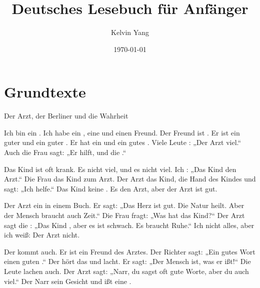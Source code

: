 \documentclass[12pt]{nextbook}
\title{Deutsches Lesebuch für Anfänger}
\author{Kelvin Yang}
\date{\today}
\begin{document}
\frontmatter
\maketitle
\tableofcontents
\mainmatter
\chapter{Grundtexte}
\begin{readersection}{Der Arzt, der Berliner und die Wahrheit}

Ich bin ein . Ich habe ein , eine  und einen  Freund. Der Freund ist . Er ist ein guter  und ein guter . Er hat ein   und ein gutes . Viele Leute : „Der Arzt  viel.“ Auch die Frau sagt: „Er hilft, und die  .“

Das Kind ist oft krank. Es  nicht viel, und es  nicht viel. Ich : „Das Kind  den Arzt.“ Die Frau  das Kind zum Arzt. Der Arzt  das Kind,  die Hand des Kindes und sagt: „Ich helfe.“ Das Kind  keine . Es  den Arzt, aber der Arzt ist gut.

Der Arzt  ein  in einem Buch. Er sagt: „Das Herz ist gut. Die Natur heilt. Aber der Mensch braucht auch Zeit.“ Die Frau fragt: „Was hat das Kind?“ Der Arzt sagt die : „Das Kind , aber es ist schwach. Es braucht Ruhe.“ Ich  nicht alles, aber ich weiß: Der Arzt  nicht.

Der  kommt auch. Er ist ein Freund des Arztes. Der Richter sagt: „Ein gutes Wort  einen guten .“ Der  hört das  und lacht. Er sagt: „Der Mensch ist, was er ißt!“ Die Leute lachen auch. Der Arzt sagt: „Narr, du sagst oft gute Worte, aber du  auch viel.“ Der Narr  sein Gesicht und ißt eine .


\end{readersection}
\end{document}
